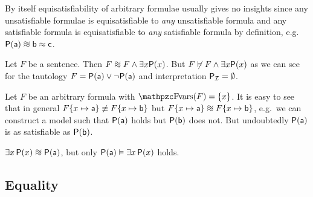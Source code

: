 \begin{remark}
	By itself equisatisfiability of arbitrary formulae
	usually gives no insights since
	any unsatisfiable formulae is equisatisfiable to \emph{any} unsatisfiable formula
	and any satisfiable formula is equisatisfiable to \emph{any} satisfiable formula by definition,
	e.g.\ \(\mP(\ma) \equisat \mb\mEQ\mc \). %
\end{remark}

\begin{example}
	Let \( F \) be a sentence.
	Then \( F \equisat F \land \exists x \mP(x) \).
	But \( F \not\vDash F \land \exists x \mathsf{P}(x) \)
	as we can see for the tautology \( F = \mathsf{P}(\mathsf{a})\lor\lnot\mathsf{P}(\mathsf{a}) \)
	and interpretation \( \mathsf{P}_{\mathcal{I}} = \emptyset \).
\end{example}



\begin{example}
	Let \(F\) be an arbitrary formula with \( \fvar(F) = \{ x \} \).
	It is easy to see that in general
	\( F\{ x\mapsto\mathsf{a} \} \not\equiv F\{ x\mapsto\mathsf{b} \} \)
	but
	\( F\{ x\mapsto\ma \} \equisat F\{ x\mapsto\mb \} \),
	e.g.~we can construct a model such that
	\(\mathsf{P}(\mathsf{a})\) holds but \(\mathsf{P}(\mathsf{b})\) does not.
	But undoubtedly \(\mathsf{P}(\mathsf{a})\) is as satisfiable as
	 \(\mathsf{P}(\mathsf{b})\).
\end{example}

\begin{example}
	\( \exists x \, \mP(x) \equisat \mP(\ma) \), but only
	\( \mathsf{P}(\mathsf{a}) \vDash \exists x \, \mathsf{P}(x) \) holds.
\end{example}



\subsection{Equality}

